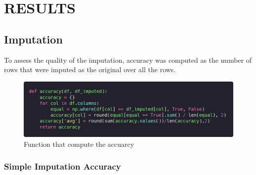 \documentclass{article}
\begin{document}
\section{RESULTS}

\subsection{Imputation}
To assess the quality of the imputation, accuracy was computed as the number of rows that were imputed as the original over all the rows.

\begin{figure}[h]\centering
	\includegraphics[scale=0.3]{img/accuracy.png}
	\caption{Function that compute the accuarcy}
\end{figure}
\subsubsection{Simple Imputation Accuracy}
\end{document}
